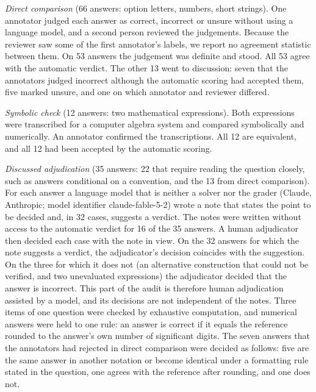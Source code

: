 \documentclass[11pt]{article}
\begin{document}
\emph{Direct comparison} (66 answers: option letters, numbers, short strings).
One annotator judged each answer as correct, incorrect or unsure without using a language model, and a second person reviewed the judgements. Because the reviewer saw some of the first annotator's labels, we report no agreement statistic between them.
On 53 answers the judgement was definite and stood. All 53 agree with the automatic verdict.
The other 13 went to discussion: seven that the annotators judged incorrect although the automatic scoring had accepted them, five marked unsure, and one on which annotator and reviewer differed.

\emph{Symbolic check} (12 answers: two mathematical expressions).
Both expressions were transcribed for a computer algebra system and compared symbolically and numerically. An annotator confirmed the transcriptions.
All 12 are equivalent, and all 12 had been accepted by the automatic scoring.

\emph{Discussed adjudication} (35 answers: 22 that require reading the question closely, such as answers conditional on a convention, and the 13 from direct comparison).
For each answer a language model that is neither a solver nor the grader (Claude, Anthropic; model identifier claude-fable-5-2) wrote a note that states the point to be decided and, in 32 cases, suggests a verdict. The notes were written without access to the automatic verdict for 16 of the 35 answers.
A human adjudicator then decided each case with the note in view.
On the 32 answers for which the note suggests a verdict, the adjudicator's decision coincides with the suggestion. On the three for which it does not (an alternative construction that could not be verified, and two unevaluated expressions) the adjudicator decided that the answer is incorrect.
This part of the audit is therefore human adjudication assisted by a model, and its decisions are not independent of the notes.
Three items of one question were checked by exhaustive computation, and numerical answers were held to one rule: an answer is correct if it equals the reference rounded to the answer's own number of significant digits.
The seven answers that the annotators had rejected in direct comparison were decided as follows: five are the same answer in another notation or become identical under a formatting rule stated in the question, one agrees with the reference after rounding, and one does not.
\end{document}
